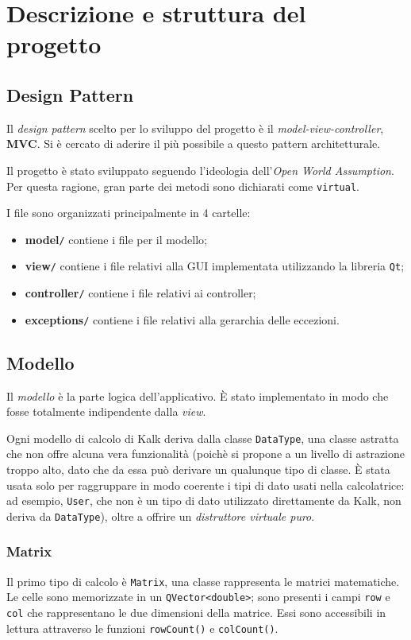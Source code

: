 \section{Descrizione e struttura del progetto}

\subsection{Design Pattern}
Il \emph{design pattern} scelto per lo sviluppo del progetto è il 
\emph{model-view-controller}, \textbf{MVC}. Si è cercato di aderire
il più possibile a questo pattern architetturale. \par
Il progetto è stato sviluppato seguendo l'ideologia dell'\emph{Open World Assumption}.
Per questa ragione, gran parte dei metodi sono dichiarati come \texttt{virtual}.\par
I file sono organizzati principalmente in 4 cartelle:
\begin{itemize}
    \item \textbf{model}\verb|/| contiene i file per il modello;
    \item \textbf{view}\verb|/| contiene i file relativi alla GUI implementata utilizzando 
    la libreria \texttt{Qt};
    \item \textbf{controller}\verb|/| contiene i file relativi ai controller;
    \item \textbf{exceptions}\verb|/| contiene i file relativi alla gerarchia delle eccezioni.
\end{itemize}


\subsection{Modello}
Il \emph{modello} è la parte logica dell'applicativo. È stato implementato in
modo che fosse totalmente indipendente dalla \emph{view}. \par
Ogni modello di calcolo di Kalk deriva dalla classe \texttt{DataType}, una classe
astratta che non offre alcuna vera funzionalità (poichè si propone a un livello di astrazione
troppo alto, dato che da essa può derivare un qualunque tipo di classe. È stata usata solo per
raggruppare in modo coerente i tipi di dato usati nella calcolatrice: ad esempio, \texttt{User},
che non è un tipo di dato utilizzato direttamente da Kalk, non deriva da \texttt{DataType}), 
oltre a offrire un \emph{distruttore virtuale puro}.
\subsubsection{Matrix}
Il primo tipo di calcolo è \texttt{Matrix}, una classe rappresenta le matrici matematiche.
Le celle sono memorizzate in un \texttt{QVector<double>}; sono presenti
i campi \texttt{row} e \texttt{col} che rappresentano le due dimensioni della matrice.
Essi sono accessibili in lettura attraverso le funzioni \texttt{rowCount()} e 
\texttt{colCount()}. \par

